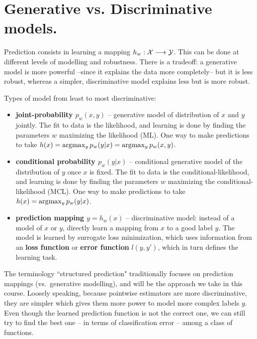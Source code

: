 \newpage
\section{Generative vs. Discriminative models.}

Prediction consists in learning a mapping $h_w: \mathcal{X} \longrightarrow \mathcal{Y}$. This
can be done at different levels of modelling and robustness. There is a
tradeoff: a generative model is more powerful --since it explains the data more
completely-- but it is less robust, whereas a simpler, discriminative model
explains less but is more robust.

Types of model from least to most discriminative:
\begin{itemize}
\item \textbf{joint-probability $p_w(x,y)$} -- generative model of distribution
    of $x$ and $y$ jointly. The fit to data is the likelihood, and learning is
    done by finding the parameters $w$ maximizing the likelihood (ML). One way
    to make predictions to take $h(x) = \arg\!\max_y p_w(y|x)= \arg\!\max_y
    p_w(x,y)$.  \item \textbf{conditional probability $p_w(y|x)$} --
    conditional generative
    model of the distribution of $y$ once $x$ is fixed. The fit to data is the
    conditional-likelihood, and learning is done by finding the parameters $w$
    maximizing the conditional-likelihood (MCL). One way to make predictions to
    take $h(x) = \arg\!\max_y p_w(y|x)$.  \item \textbf{prediction mapping
    $y=h_w(x)$} -- discriminative model: instead of a model of $x$ or $y$,
    directly learn a mapping from $x$ to a good label $y$.  The model is
    learned by surrogate loss minimization, which uses information from an
    \textbf{loss function} or \textbf{error function} $l(y,y')$, which in turn
    defines the learning task. 
\end{itemize}

The terminology ``structured prediction" traditionally focuses on prediction
mappings (vs.\ generative modelling), and will be the approach we take in this
course. Loosely speaking, because pointwise estimators are more discriminative,
they are simpler which gives them more power to model more complex labels $y$.
Even though the learned prediction function is not the correct one, we can
still try to find the best one -- in terms of classification error -- among a
class of functions.


